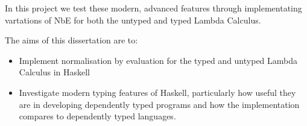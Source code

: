 In this project we test these modern, advanced features through implementating vartations of NbE for both the untyped and typed Lambda Calculus. 

The aims of this dissertation are to:
\begin{itemize}
    \item Implement normalisation by evaluation for the typed and untyped Lambda Calculus in Haskell
    
    \item Investigate modern typing features of Haskell, particularly how useful they are in developing dependently typed programs and how the implementation compares to dependently typed languages.
\end{itemize}